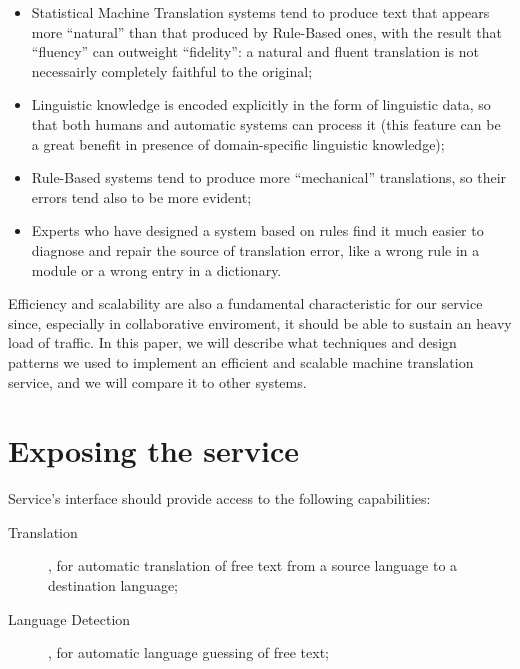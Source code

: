 \documentclass[11pt]{article}
\begin{document}
\begin{itemize}
 \item Statistical Machine Translation systems tend to produce text that appears more ``natural'' than that produced by Rule-Based ones, with
  the result that ``fluency'' can outweight ``fidelity'': a natural and fluent translation is not necessairly completely faithful to the original;
 \item Linguistic knowledge is encoded explicitly in the form of linguistic data, so that both humans and automatic systems can process 
  it (this feature can be a great benefit in presence of domain-specific linguistic knowledge);
 \item Rule-Based systems tend to produce more ``mechanical'' translations, so their errors tend also to be more evident;
 \item Experts who have designed a system based on rules find it much easier to diagnose and repair the source of translation error, like
  a wrong rule in a module or a wrong entry in a dictionary.
\end{itemize}

Efficiency and scalability are also a fundamental characteristic for our service since, especially in collaborative enviroment, it should be able
to sustain an heavy load of traffic. In this paper, we will describe what techniques and design patterns we used to implement an efficient and
scalable machine translation service, and we will compare it to other systems.


\section{Exposing the service}

Service's interface should provide access to the following capabilities:

\begin{description}
  \item[Translation], for automatic translation of free text from a source language to a destination language;
  \item[Language Detection], for automatic language guessing of free text;
\end{description}
\end{document}
